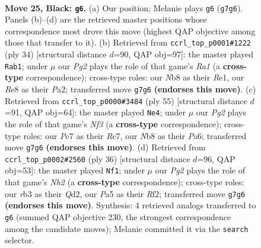 \documentclass[11pt]{article}
\begin{document}
\clearpage

\begin{figure}[p]\centering
\begin{subfigure}{0.46\textwidth}\centering
\resizebox{\linewidth}{!}{%
\newchessgame
\chessboard[
  setfen={rn2r1k1/2pnq1pp/1p2p3/p3Pp2/3P1P1P/PR3NNQ/2PK2P1/7R b - - 0 25},
  showmover=false,
  pgfstyle=straightmove, color=movearrow, markmove={g7-g6}
]}
\caption{}
\end{subfigure}\hfill
\begin{subfigure}{0.46\textwidth}\centering
\resizebox{\linewidth}{!}{%
\newchessgame
\chessboard[
  setfen={2n1r1k1/1p3rpp/pnpq1p2/3p4/1P1P4/2NQP3/P2N1PPP/R3R1K1 w - - 1 18},
  showmover=false,
  pgfstyle=straightmove, color=movearrow, markmove={a1-b1}
]}
\caption{}
\end{subfigure}
\\[4pt]
\begin{subfigure}{0.46\textwidth}\centering
\resizebox{\linewidth}{!}{%
\newchessgame
\chessboard[
  setfen={2r3k1/2r1qpp1/p1n1pn1p/1p1p4/3P1N1P/P3P1P1/NP3PK1/2RRQ3 b - - 2 28},
  showmover=false,
  pgfstyle=straightmove, color=movearrow, markmove={f6-e4}
]}
\caption{}
\end{subfigure}\hfill
\begin{subfigure}{0.46\textwidth}\centering
\resizebox{\linewidth}{!}{%
\newchessgame
\chessboard[
  setfen={r1bq1rnk/1pp3p1/p2p2np/P3p3/2B1P3/2P1PN1P/1P1Q1RPN/R5K1 w - - 3 19},
  showmover=false,
  pgfstyle=straightmove, color=movearrow, markmove={h2-f1}
]}
\caption{}
\end{subfigure}
\caption{\textbf{Move 25, Black: \texttt{g6}.} (a) Our position; Melanie plays \texttt{g6} (\texttt{g7g6}). Panels (b)--(d) are the retrieved master positions whose correspondence most drove this move (highest QAP objective among those that transfer to it). (b) Retrieved from \texttt{ccrl\_top\_p0001\#1222} (ply 34) [structural distance $d$=90, QAP obj=97]: the master played \texttt{Rab1}; under $\mu$ our \emph{Pg2} plays the role of that game's \emph{Ra1} (a \textbf{cross-type} correspondence); cross-type roles: our \emph{N}b8 as their \emph{R}e1, our \emph{R}e8 as their \emph{P}a2; transferred move \texttt{g7g6} \textbf{(endorses this move)}. (c) Retrieved from \texttt{ccrl\_top\_p0000\#3484} (ply 55) [structural distance $d$=91, QAP obj=64]: the master played \texttt{Ne4}; under $\mu$ our \emph{Pg2} plays the role of that game's \emph{Nf3} (a \textbf{cross-type} correspondence); cross-type roles: our \emph{P}c7 as their \emph{R}c7, our \emph{N}b8 as their \emph{P}a6; transferred move \texttt{g7g6} \textbf{(endorses this move)}. (d) Retrieved from \texttt{ccrl\_top\_p0002\#2560} (ply 36) [structural distance $d$=96, QAP obj=53]: the master played \texttt{Nf1}; under $\mu$ our \emph{Pg2} plays the role of that game's \emph{Nh2} (a \textbf{cross-type} correspondence); cross-type roles: our \emph{r}b3 as their \emph{Q}d2, our \emph{P}a5 as their \emph{R}f2; transferred move \texttt{g7g6} \textbf{(endorses this move)}. Synthesis: 4 retrieved analogs transferred to \texttt{g6} (summed QAP objective 230, the strongest correspondence among the candidate moves); Melanie committed it via the \texttt{search} selector.}
\label{fig:thought-m49}
\end{figure}
\end{document}
